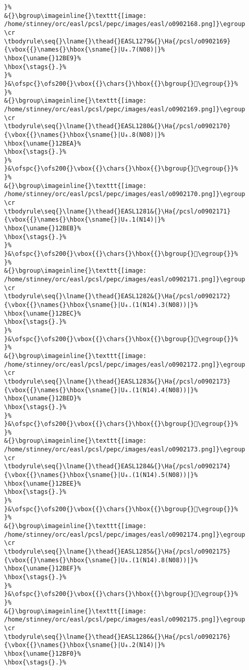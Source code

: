 \begin{verbatim}
}%
&{}\bgroup\imageinline{}\texttt{[image: /home/stinney/orc/easl/pcsl/pepc/images/easl/o0902168.png]}\egroup
\cr
\tbodyrule\seq{}\lname{}\thead{}EASL1279&{}\Ha{/pcsl/o0902169}{\vbox{{}\names{}\hbox{\sname{}|U₄.7(N08)|}%
\hbox{\uname{}12BE9}%
\hbox{\stags{}.}%
}%
}&\ofspc{}\ofs200{}\vbox{{}\chars{}\hbox{{}\bgroup{}𒯩\egroup{}}%
}%
&{}\bgroup\imageinline{}\texttt{[image: /home/stinney/orc/easl/pcsl/pepc/images/easl/o0902169.png]}\egroup
\cr
\tbodyrule\seq{}\lname{}\thead{}EASL1280&{}\Ha{/pcsl/o0902170}{\vbox{{}\names{}\hbox{\sname{}|U₄.8(N08)|}%
\hbox{\uname{}12BEA}%
\hbox{\stags{}.}%
}%
}&\ofspc{}\ofs200{}\vbox{{}\chars{}\hbox{{}\bgroup{}𒯪\egroup{}}%
}%
&{}\bgroup\imageinline{}\texttt{[image: /home/stinney/orc/easl/pcsl/pepc/images/easl/o0902170.png]}\egroup
\cr
\tbodyrule\seq{}\lname{}\thead{}EASL1281&{}\Ha{/pcsl/o0902171}{\vbox{{}\names{}\hbox{\sname{}|U₄.1(N14)|}%
\hbox{\uname{}12BEB}%
\hbox{\stags{}.}%
}%
}&\ofspc{}\ofs200{}\vbox{{}\chars{}\hbox{{}\bgroup{}𒯫\egroup{}}%
}%
&{}\bgroup\imageinline{}\texttt{[image: /home/stinney/orc/easl/pcsl/pepc/images/easl/o0902171.png]}\egroup
\cr
\tbodyrule\seq{}\lname{}\thead{}EASL1282&{}\Ha{/pcsl/o0902172}{\vbox{{}\names{}\hbox{\sname{}|U₄.(1(N14).3(N08))|}%
\hbox{\uname{}12BEC}%
\hbox{\stags{}.}%
}%
}&\ofspc{}\ofs200{}\vbox{{}\chars{}\hbox{{}\bgroup{}𒯬\egroup{}}%
}%
&{}\bgroup\imageinline{}\texttt{[image: /home/stinney/orc/easl/pcsl/pepc/images/easl/o0902172.png]}\egroup
\cr
\tbodyrule\seq{}\lname{}\thead{}EASL1283&{}\Ha{/pcsl/o0902173}{\vbox{{}\names{}\hbox{\sname{}|U₄.(1(N14).4(N08))|}%
\hbox{\uname{}12BED}%
\hbox{\stags{}.}%
}%
}&\ofspc{}\ofs200{}\vbox{{}\chars{}\hbox{{}\bgroup{}𒯭\egroup{}}%
}%
&{}\bgroup\imageinline{}\texttt{[image: /home/stinney/orc/easl/pcsl/pepc/images/easl/o0902173.png]}\egroup
\cr
\tbodyrule\seq{}\lname{}\thead{}EASL1284&{}\Ha{/pcsl/o0902174}{\vbox{{}\names{}\hbox{\sname{}|U₄.(1(N14).5(N08))|}%
\hbox{\uname{}12BEE}%
\hbox{\stags{}.}%
}%
}&\ofspc{}\ofs200{}\vbox{{}\chars{}\hbox{{}\bgroup{}𒯮\egroup{}}%
}%
&{}\bgroup\imageinline{}\texttt{[image: /home/stinney/orc/easl/pcsl/pepc/images/easl/o0902174.png]}\egroup
\cr
\tbodyrule\seq{}\lname{}\thead{}EASL1285&{}\Ha{/pcsl/o0902175}{\vbox{{}\names{}\hbox{\sname{}|U₄.(1(N14).8(N08))|}%
\hbox{\uname{}12BEF}%
\hbox{\stags{}.}%
}%
}&\ofspc{}\ofs200{}\vbox{{}\chars{}\hbox{{}\bgroup{}𒯯\egroup{}}%
}%
&{}\bgroup\imageinline{}\texttt{[image: /home/stinney/orc/easl/pcsl/pepc/images/easl/o0902175.png]}\egroup
\cr
\tbodyrule\seq{}\lname{}\thead{}EASL1286&{}\Ha{/pcsl/o0902176}{\vbox{{}\names{}\hbox{\sname{}|U₄.2(N14)|}%
\hbox{\uname{}12BF0}%
\hbox{\stags{}.}%

\end{verbatim}
